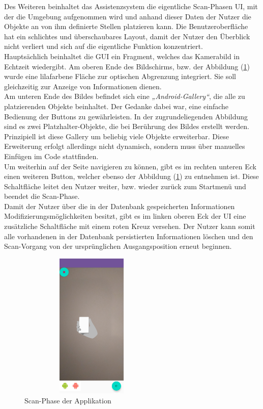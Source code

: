 Des Weiteren beinhaltet das Assistenzsystem die eigentliche Scan-Phasen \acs{UI}, mit der die Umgebung aufgenommen wird und anhand dieser Daten 
der Nutzer die Objekte an von ihm definierte Stellen platzieren kann. Die Benutzeroberfläche hat ein schlichtes und überschaubares Layout, damit der Nutzer den 
Überblick nicht verliert und sich auf die eigentliche Funktion konzentriert. 
\\ 
Hauptsächlich beinhaltet die \acs{GUI} ein Fragment, welches das Kamerabild in Echtzeit wiedergibt. Am oberen Ende des Bildschirms, bzw. der Abbildung 
(\ref{pic:scan}) wurde eine lilafarbene Fläche zur optischen Abgrenzung integriert. Sie soll gleichzeitig zur Anzeige von Informationen dienen. 
\\ 
Am unteren Ende des Bildes befindet sich eine \textit{„Android-Gallery“}, die alle zu platzierenden Objekte beinhaltet. Der Gedanke dabei war, eine einfache 
Bedienung der Buttons zu gewährleisten. In der zugrundeliegenden Abbildung sind es zwei Platzhalter-Objekte, die bei Berührung des Bildes erstellt werden. 
Prinzipiell ist diese Gallery um beliebig viele Objekte erweiterbar. Diese Erweiterung erfolgt allerdings nicht dynamisch, sondern muss über manuelles 
Einfügen im Code stattfinden. 
\\ 
\linebreak
Um weiterhin auf der Seite navigieren zu können, gibt es im rechten unteren Eck einen weiteren Button, welcher ebenso der Abbildung (\ref{pic:scan}) 
zu entnehmen ist. Diese Schaltfläche leitet den Nutzer weiter, bzw. wieder zurück zum Startmenü und beendet die Scan-Phase. 
\\ 
\linebreak
Damit der Nutzer über die in der Datenbank gespeicherten Informationen Modifizierungsmöglichkeiten besitzt, gibt es im linken oberen Eck der \acs{UI} eine 
zusätzliche Schaltfläche mit einem roten Kreuz versehen. Der Nutzer kann somit alle vorhandenen in der Datenbank persistierten Informationen löschen 
und den Scan-Vorgang von der ursprünglichen Ausgangsposition erneut beginnen. %
\begin{figure}[hbt!]
    \centering
    \includegraphics[width=7cm,height=7cm,keepaspectratio]{4Umsetzung/Bilder/scan-phase.jpg}
    \caption{Scan-Phase der Applikation}
    \label{pic:scan}
\end{figure}
